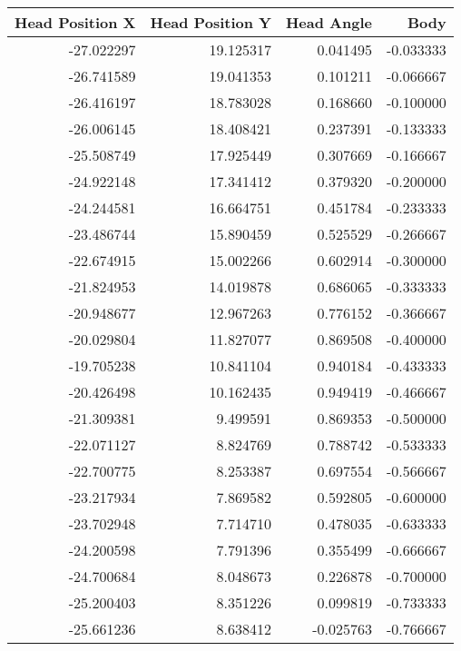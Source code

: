 \begin{tabular}{rrrr}
\toprule
 Head Position X &  Head Position Y &  Head Angle &       Body \\
\midrule
      -27.022297 &        19.125317 &    0.041495 &  -0.033333 \\
      -26.741589 &        19.041353 &    0.101211 &  -0.066667 \\
      -26.416197 &        18.783028 &    0.168660 &  -0.100000 \\
      -26.006145 &        18.408421 &    0.237391 &  -0.133333 \\
      -25.508749 &        17.925449 &    0.307669 &  -0.166667 \\
      -24.922148 &        17.341412 &    0.379320 &  -0.200000 \\
      -24.244581 &        16.664751 &    0.451784 &  -0.233333 \\
      -23.486744 &        15.890459 &    0.525529 &  -0.266667 \\
      -22.674915 &        15.002266 &    0.602914 &  -0.300000 \\
      -21.824953 &        14.019878 &    0.686065 &  -0.333333 \\
      -20.948677 &        12.967263 &    0.776152 &  -0.366667 \\
      -20.029804 &        11.827077 &    0.869508 &  -0.400000 \\
      -19.705238 &        10.841104 &    0.940184 &  -0.433333 \\
      -20.426498 &        10.162435 &    0.949419 &  -0.466667 \\
      -21.309381 &         9.499591 &    0.869353 &  -0.500000 \\
      -22.071127 &         8.824769 &    0.788742 &  -0.533333 \\
      -22.700775 &         8.253387 &    0.697554 &  -0.566667 \\
      -23.217934 &         7.869582 &    0.592805 &  -0.600000 \\
      -23.702948 &         7.714710 &    0.478035 &  -0.633333 \\
      -24.200598 &         7.791396 &    0.355499 &  -0.666667 \\
      -24.700684 &         8.048673 &    0.226878 &  -0.700000 \\
      -25.200403 &         8.351226 &    0.099819 &  -0.733333 \\
      -25.661236 &         8.638412 &   -0.025763 &  -0.766667 \\

\end{tabular}
